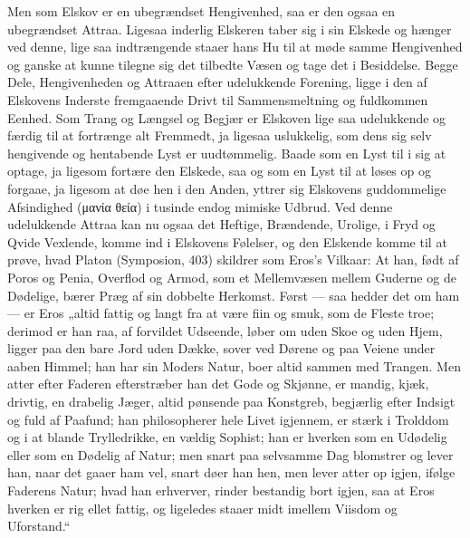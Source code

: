 \documentclass[12pt,a4paper]{book}
\newcommand{\apage}[1]{\marginnote{\footnotesize\textit{[#1]}}}
\begin{document}
Men som Elskov er en ubegrændset Hengivenhed, saa er den ogsaa en
ubegrændset Attraa. Ligesaa inderlig Elskeren taber sig i sin Elskede
og hænger ved denne, lige saa indtrængende staaer hans Hu til at møde
samme Hengivenhed og ganske at kunne tilegne sig det tilbedte Væsen og
tage det i Besiddelse. Begge \apage{28} Dele, Hengivenheden og Attraaen efter
udelukkende Forening, ligge i den af Elskovens Inderste fremgaaende
Drivt til Sammensmeltning og fuldkommen Eenhed. Som Trang og Længsel og
Begjær er Elskoven lige saa udelukkende og færdig til at fortrænge alt
Fremmedt, ja ligesaa uslukkelig, som dens sig selv hengivende og
hentabende Lyst er uudtømmelig. Baade som en Lyst til i sig at optage,
ja ligesom fortære den Elskede, saa og som en Lyst til at løses op og
forgaae, ja ligesom at døe hen i den Anden, yttrer sig Elskovens
guddommelige Afsindighed (μανία θεία) i tusinde endog mimiske Udbrud.
Ved denne udelukkende Attraa kan nu ogsaa det Heftige, Brændende,
Urolige, i Fryd og Qvide Vexlende, komme ind i Elskovens Følelser, og
den Elskende komme til at prøve, hvad Platon (Symposion, 403) skildrer
som Eros's Vilkaar: At han, født af Poros og Penia, Overflod og Armod,
som et Mellemvæsen mellem Guderne og de Dødelige, bærer Præg af sin
dobbelte Herkomst. Først --- saa hedder det om ham --- er Eros „altid
fattig og langt fra at være fiin og smuk, som de Fleste troe; derimod
er han raa, af forvildet Udseende, løber om uden Skoe og uden Hjem,
ligger paa den bare Jord uden Dække, sover ved Dørene og paa Veiene
under aaben Himmel; han har sin Moders Natur, boer altid sammen med
Trangen. Men atter efter Faderen efterstræber han det Gode og Skjønne,
er mandig, kjæk, drivtig, en drabelig Jæger, altid pønsende paa
Konstgreb, \apage{29} begjærlig efter Indsigt og fuld af Paafund; han
philosopherer hele Livet igjennem, er stærk i Trolddom og i at blande
Trylledrikke, en vældig Sophist; han er hverken som en Udødelig eller
som en Dødelig af Natur; men snart paa selvsamme Dag blomstrer og lever
han, naar det gaaer ham vel, snart døer han hen, men lever atter op
igjen, ifølge Faderens Natur; hvad han erhverver, rinder bestandig bort
igjen, saa at Eros hverken er rig ellet fattig, og ligeledes staaer
midt imellem Viisdom og Uforstand.“
\end{document}

